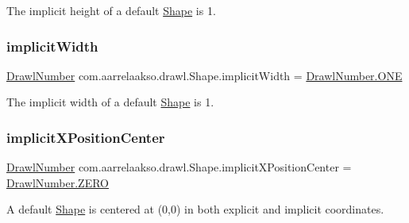 The implicit height of a default \hyperlink{classcom_1_1aarrelaakso_1_1drawl_1_1_shape}{Shape} is 1. 

\mbox{\label{classcom_1_1aarrelaakso_1_1drawl_1_1_shape_a00c6b870d70449a79a000a3374ae041c}} 
\subsubsection{\texorpdfstring{implicit\+Width}{implicitWidth}}
{\footnotesize\ttfamily \hyperlink{classcom_1_1aarrelaakso_1_1drawl_1_1_drawl_number}{Drawl\+Number} com.\+aarrelaakso.\+drawl.\+Shape.\+implicit\+Width = \hyperlink{classcom_1_1aarrelaakso_1_1drawl_1_1_drawl_number_a0cd06e1d6344869ed300bc99afcde20a}{Drawl\+Number.\+O\+NE}\hspace{0.3cm}{\ttfamily [private]}}



The implicit width of a default \hyperlink{classcom_1_1aarrelaakso_1_1drawl_1_1_shape}{Shape} is 1. 

\mbox{\label{classcom_1_1aarrelaakso_1_1drawl_1_1_shape_aa81b1d70b8974560f2c54b09809edcec}} 
\subsubsection{\texorpdfstring{implicit\+X\+Position\+Center}{implicitXPositionCenter}}
{\footnotesize\ttfamily \hyperlink{classcom_1_1aarrelaakso_1_1drawl_1_1_drawl_number}{Drawl\+Number} com.\+aarrelaakso.\+drawl.\+Shape.\+implicit\+X\+Position\+Center = \hyperlink{classcom_1_1aarrelaakso_1_1drawl_1_1_drawl_number_a14c9ceff1fb3f2bd5c3b380183db933a}{Drawl\+Number.\+Z\+E\+RO}\hspace{0.3cm}{\ttfamily [private]}}



A default \hyperlink{classcom_1_1aarrelaakso_1_1drawl_1_1_shape}{Shape} is centered at (0,0) in both explicit and implicit coordinates. 

